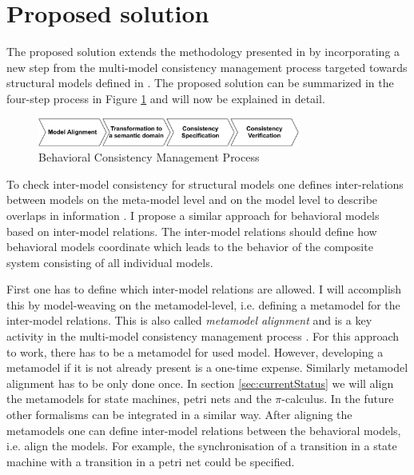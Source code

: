 \documentclass[conference]{IEEEtran}
\begin{document}
\section{Proposed solution}
The proposed solution extends the methodology presented in \cite{engelsMethodologySpecifyingAnalyzing2001} by incorporating a new step from the multi-model consistency management process targeted towards structural models defined in \cite{stunkelMultipleModelSynchronization2020}.
The proposed solution can be summarized in the four-step process in Figure \ref{fig:consistency_process} and will now  be explained in detail.

\begin{figure}[!t]
\centering
\includegraphics[width=3.4in]{methodology}
\caption{Behavioral Consistency Management Process}
\label{fig:consistency_process}
\end{figure}

To check inter-model consistency for structural models one defines inter-relations between models on the meta-model level and on the model level to describe overlaps in information \cite{stunkelMultipleModelSynchronization2020}.
I propose a similar approach for behavioral models based on inter-model relations.
The inter-model relations should define how behavioral models coordinate which leads to the behavior of the composite system consisting of all individual models.

First one has to define which inter-model relations are allowed.
I will accomplish this by model-weaving on the metamodel-level, i.e. defining a metamodel for the inter-model relations.
This is also called \textit{metamodel alignment} and is a key activity in the multi-model consistency management process \cite{stunkelMultipleModelSynchronization2020}.
For this approach to work, there has to be a metamodel for used model.
However, developing a metamodel if it is not already present is a one-time expense.
Similarly metamodel alignment has to be only done once.
In section \ref{sec:currentStatus} we will align the metamodels for state machines, petri nets and the $\pi$-calculus.
In the future other formalisms can be integrated in a similar way.
After aligning the metamodels one can define inter-model relations between the behavioral models, i.e. align the models.
For example, the synchronisation of a transition in a state machine with a transition in a petri net could be specified.
\end{document}
